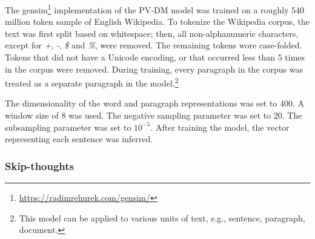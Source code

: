 \documentclass[11pt,letterpaper]{article}
\begin{document}
The gensim\footnote{\url{https://radimrehurek.com/gensim/}}
implementation of the PV-DM model was trained on a roughly 540 million
token sample of English Wikipedia. To tokenize the Wikipedia corpus,
the text was first split based on whitespace; then, all
non-alphanumeric characters, except for \emph{+}, \emph{-}, \emph{\$}
and \emph{\%}, were removed. The remaining tokens wore
case-folded. Tokens that did not have a Unicode encoding, or that
occurred less than 5 times in the corpus were removed. During
training, every paragraph in the corpus was treated as a separate
paragraph in the model.\footnote{This model can be applied to various
  units of text, e.g., sentence, paragraph, document.}


The dimensionality of the word and paragraph representations was set
to 400.  A window size of 8 was used. The negative sampling parameter
was set to 20. The subsampling parameter was set to ${10}^{-5}$.
After training the model, the vector representing each sentence was
inferred.


\subsubsection{Skip-thoughts\label{sec:skipthoughts}}
\end{document}
